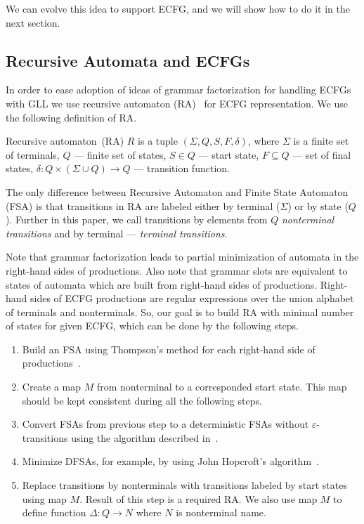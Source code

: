\documentclass[runningheads,a4paper]{llncs}
\begin{document}
We can evolve this idea to support ECFG, and we will show how to do it in the next section.

\subsection{Recursive Automata and ECFGs}

In order to ease adoption of ideas of grammar factorization for handling ECFGs with GLL we use recursive automaton (RA)~\cite{tellier2006learning} for ECFG representation.
We use the following definition of RA.

\begin{mydef}
    Recursive automaton~(RA) $R$ is a tuple $(\Sigma, Q, S, F, \delta)$, where $\Sigma$ is a finite set of terminals, $Q$ --- finite set of states, $S \in Q$ --- start state, $F \subseteq Q$ --- set of final states, $\delta : Q \times (\Sigma \cup Q) \to Q$ --- transition function.
\end{mydef}

The only difference between Recursive Automaton and Finite State Automaton (FSA) is that transitions in RA are labeled either by terminal ($\Sigma$) or by state ($Q$).
Further in this paper, we call transitions by elements from $Q$ \textit{nonterminal transitions} and by terminal --- \textit{terminal transitions}.

Note that grammar factorization leads to partial minimization of automata in the right-hand sides of productions.
Also note that grammar slots are equivalent to states of automata which are built from right-hand sides of productions.
Right-hand sides of ECFG productions are regular expressions over the union alphabet of terminals and nonterminals.
So, our goal is to build RA with minimal number of states for given ECFG, which can be done by the following steps.
\begin{enumerate} 
\item Build an FSA using Thompson's method for each right-hand side of productions~\cite{Thompson:1968:PTR:363347.363387}.
\item Create a map $M$ from nonterminal to a corresponded start state.
This map should be kept consistent during all the following steps. 
\item Convert FSAs from previous step to a deterministic FSAs without $\varepsilon$-transitions using the algorithm described in~\cite{aho1974design}.
\item Minimize DFSAs, for example, by using John Hopcroft's algorithm~\cite{hopcroft1971n}.
\item Replace transitions by nonterminals with transitions labeled by start states using map $M$.
Result of this step is a required RA. We also use map $M$ to define function $\Delta : Q \to N$ where $N$ is nonterminal name.
\end{enumerate}
\end{document}
